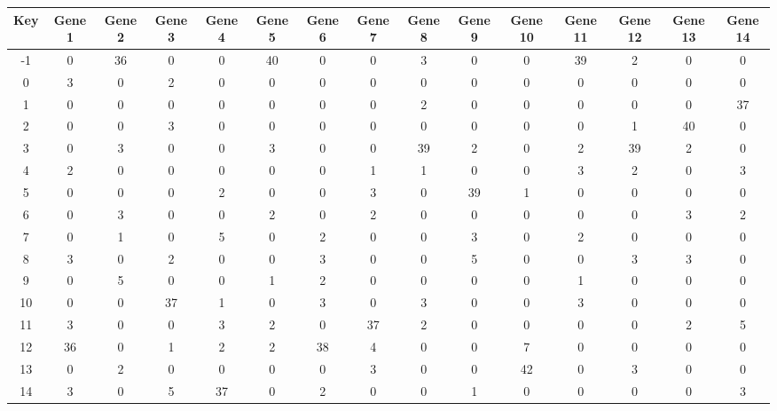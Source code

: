 \begin{tabular}{|c|c|c|c|c|c|c|c|c|c|c|c|c|c|c|}
\hline
Key & Gene 1 & Gene 2 & Gene 3 & Gene 4 & Gene 5 & Gene 6 & Gene 7 & Gene 8 & Gene 9 & Gene 10 & Gene 11 & Gene 12 & Gene 13 & Gene 14 \\
\hline
-1 & 0 & 36 & 0 & 0 & 40 & 0 & 0 & 3 & 0 & 0 & 39 & 2 & 0 & 0 \\
0 & 3 & 0 & 2 & 0 & 0 & 0 & 0 & 0 & 0 & 0 & 0 & 0 & 0 & 0 \\
1 & 0 & 0 & 0 & 0 & 0 & 0 & 0 & 2 & 0 & 0 & 0 & 0 & 0 & 37 \\
2 & 0 & 0 & 3 & 0 & 0 & 0 & 0 & 0 & 0 & 0 & 0 & 1 & 40 & 0 \\
3 & 0 & 3 & 0 & 0 & 3 & 0 & 0 & 39 & 2 & 0 & 2 & 39 & 2 & 0 \\
4 & 2 & 0 & 0 & 0 & 0 & 0 & 1 & 1 & 0 & 0 & 3 & 2 & 0 & 3 \\
5 & 0 & 0 & 0 & 2 & 0 & 0 & 3 & 0 & 39 & 1 & 0 & 0 & 0 & 0 \\
6 & 0 & 3 & 0 & 0 & 2 & 0 & 2 & 0 & 0 & 0 & 0 & 0 & 3 & 2 \\
7 & 0 & 1 & 0 & 5 & 0 & 2 & 0 & 0 & 3 & 0 & 2 & 0 & 0 & 0 \\
8 & 3 & 0 & 2 & 0 & 0 & 3 & 0 & 0 & 5 & 0 & 0 & 3 & 3 & 0 \\
9 & 0 & 5 & 0 & 0 & 1 & 2 & 0 & 0 & 0 & 0 & 1 & 0 & 0 & 0 \\
10 & 0 & 0 & 37 & 1 & 0 & 3 & 0 & 3 & 0 & 0 & 3 & 0 & 0 & 0 \\
11 & 3 & 0 & 0 & 3 & 2 & 0 & 37 & 2 & 0 & 0 & 0 & 0 & 2 & 5 \\
12 & 36 & 0 & 1 & 2 & 2 & 38 & 4 & 0 & 0 & 7 & 0 & 0 & 0 & 0 \\
13 & 0 & 2 & 0 & 0 & 0 & 0 & 3 & 0 & 0 & 42 & 0 & 3 & 0 & 0 \\
14 & 3 & 0 & 5 & 37 & 0 & 2 & 0 & 0 & 1 & 0 & 0 & 0 & 0 & 3 \\
\hline
\end{tabular}